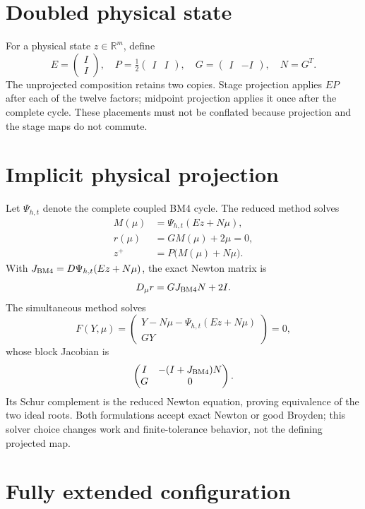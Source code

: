\documentclass[11pt,a4paper]{article}
\newcommand{\R}{\mathbb{R}}
\begin{document}
\section{Doubled physical state}

For a physical state $z\in\R^m$, define
\[
E=\begin{pmatrix}I\\I\end{pmatrix},\quad
P=\tfrac12\begin{pmatrix}I&I\end{pmatrix},\quad
G=\begin{pmatrix}I&-I\end{pmatrix},\quad N=G^T.
\]
The unprojected composition retains two copies.  Stage projection applies
$EP$ after each of the twelve factors; midpoint projection applies it once
after the complete cycle.  These placements must not be conflated because
projection and the stage maps do not commute.

\section{Implicit physical projection}

Let $\Psi_{h,t}$ denote the complete coupled BM4 cycle.  The reduced method
solves
\begin{align}
M(\mu)&=\Psi_{h,t}(Ez+N\mu),\\
r(\mu)&=GM(\mu)+2\mu=0,\\
z^+&=P\bigl(M(\mu)+N\mu\bigr).
\end{align}
With $J_{\rm BM4}=D\Psi_{h,t}(Ez+N\mu)$, the exact Newton matrix is
\[
D_\mu r=GJ_{\rm BM4}N+2I.
\]
The simultaneous method solves
\[
F(Y,\mu)=
\begin{pmatrix}
Y-N\mu-\Psi_{h,t}(Ez+N\mu)\\GY
\end{pmatrix}=0,
\]
whose block Jacobian is
\[
\begin{pmatrix}I&-(I+J_{\rm BM4})N\\G&0\end{pmatrix}.
\]
Its Schur complement is the reduced Newton equation, proving equivalence of
the two ideal roots.  Both formulations accept exact Newton or good Broyden;
this solver choice changes work and finite-tolerance behavior, not the
defining projected map.

\section{Fully extended configuration}
\end{document}
